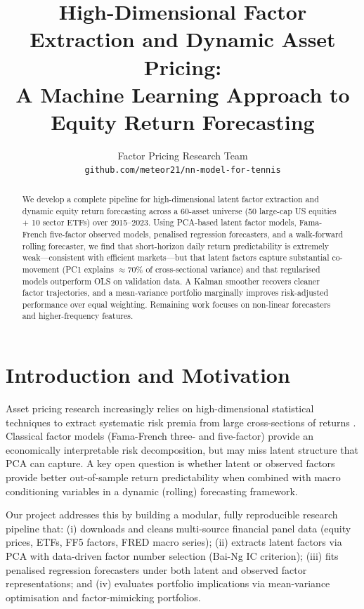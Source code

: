 \documentclass{article}
\title{High-Dimensional Factor Extraction and Dynamic Asset Pricing:\\
A Machine Learning Approach to Equity Return Forecasting}
\author{%
  Factor Pricing Research Team\\
  \texttt{github.com/meteor21/nn-model-for-tennis}
}
\begin{document}
\maketitle

\begin{abstract}
We develop a complete pipeline for high-dimensional latent factor extraction and dynamic equity return
forecasting across a 60-asset universe (50 large-cap US equities + 10 sector ETFs) over 2015--2023.
Using PCA-based latent factor models, Fama-French five-factor observed models, penalised regression
forecasters, and a walk-forward rolling forecaster, we find that short-horizon daily return
predictability is extremely weak---consistent with efficient markets---but that latent factors
capture substantial co-movement (PC1 explains $\approx$70\% of cross-sectional variance) and that
regularised models outperform OLS on validation data. A Kalman smoother recovers cleaner factor
trajectories, and a mean-variance portfolio marginally improves risk-adjusted performance over equal
weighting. Remaining work focuses on non-linear forecasters and higher-frequency features.
\end{abstract}

\section{Introduction and Motivation}

Asset pricing research increasingly relies on high-dimensional statistical techniques to extract
systematic risk premia from large cross-sections of returns \cite{bai2002}. Classical factor models
(Fama-French three- and five-factor) provide an economically interpretable risk decomposition, but
may miss latent structure that PCA can capture. A key open question is whether latent or observed
factors provide better out-of-sample return predictability when combined with macro conditioning
variables in a dynamic (rolling) forecasting framework.

Our project addresses this by building a modular, fully reproducible research pipeline that:
(i) downloads and cleans multi-source financial panel data (equity prices, ETFs, FF5 factors, FRED
macro series); (ii) extracts latent factors via PCA with data-driven factor number selection
(Bai-Ng IC criterion); (iii) fits penalised regression forecasters under both latent and observed
factor representations; and (iv) evaluates portfolio implications via mean-variance optimisation and
factor-mimicking portfolios.
\end{document}
